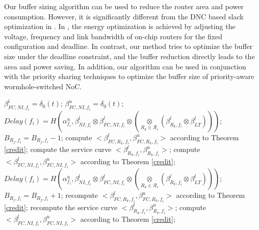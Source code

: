 \documentclass[preprint]{elsarticle}
\begin{document}
Our buffer sizing algorithm can be used to reduce the router area and power consumption. However, it is significantly different from the DNC based slack optimization in \cite{6560630}. In \cite{6560630}, the energy optimization is achieved by adjusting the voltage, frequency and link bandwidth of on-chip routers for the fixed configuration and deadline. In contrast, our method tries to optimize the buffer size under the deadline constraint, and the buffer reduction directly leads to the area and power saving. In addition, our algorithm can be used in conjunction with the priority sharing techniques \cite{5161497} to optimize the buffer size of priority-aware wormhole-switched NoC.
\begin{algorithm}
\label{alg:bufopt}
\begin{algorithmic}[1]
       \State $\beta_{FC,NI,f_i}^l=\delta_0(t)$; $\beta_{FC,NI,f_i}^u=\delta_0(t)$;
            \State $Delay(f_i)=H(\alpha_{f_i}^u,\beta_{NI,f_i}^l\otimes\beta^l_{FC,NI,f_i}\otimes (\underset{R_k\in\mathcal{R}_{i}}{\otimes}(\beta^l_{R_k,f_i}\otimes\beta^l_{LT})))$;
                \State $B_{R_j,f_i}=B_{R_j,f_i}-1$;
                    \State compute $<\beta_{FC,R_k,f_i}^l,\beta_{FC,R_k,f_i}^u>$ according to Theorem \ref{credit};
                    \State compute the service curve $<\beta_{R_k,f_i}^l,\beta_{R_k,f_i}^u>$;
                \EndFor
                \State compute $<\beta_{FC,NI,f_i}^l,\beta_{FC,NI,f_i}^u>$ according to Theorem \ref{credit};
                \State $Delay(f_i)=H(\alpha_{f_i}^u,\beta_{NI,f_i}^l\otimes\beta^l_{FC,NI,f_i}\otimes (\underset{R_k\in\mathcal{R}_{i}}{\otimes}(\beta^l_{R_k,f_i}\otimes\beta^l_{LT})))$;
            \EndWhile
                \State $B_{R_j,f_i}=B_{R_j,f_i}+1$;
                    \State recompute $<\beta_{FC,R_k,f_i}^l,\beta_{FC,R_k,f_i}^u>$ according to Theorem \ref{credit};
                    \State recompute the service curve $<\beta_{R_k,f_i}^l,\beta_{R_k,f_i}^u>$;
                \EndFor
                \State compute $<\beta_{FC,NI,f_i}^l,\beta_{FC,NI,f_i}^u>$ according to Theorem \ref{credit};
            \EndIf
        \EndFor
\EndFunction
\end{algorithmic}
\end{algorithm}
\end{document}
